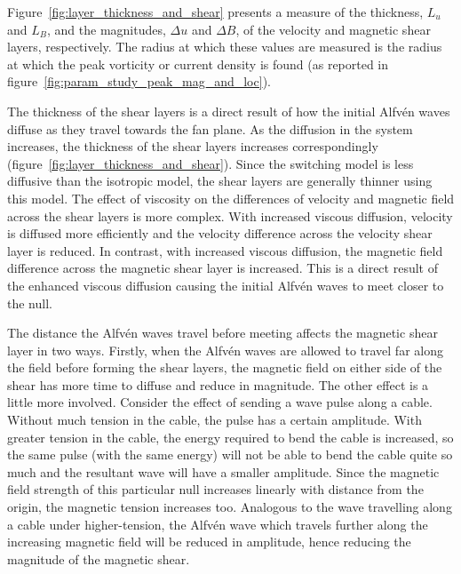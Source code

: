 Figure~\ref{fig:layer_thickness_and_shear} presents a measure of the thickness, $L_u$ and $L_B$, and the magnitudes, $\Delta u$ and $\Delta B$, of the velocity and magnetic shear layers, respectively. The radius at which these values are measured is the radius at which the peak vorticity or current density is found (as reported in figure~\ref{fig:param_study_peak_mag_and_loc}). 

The thickness of the shear layers is a direct result of how the initial Alfv\'en waves diffuse as they travel towards the fan plane. As the diffusion in the system increases, the thickness of the shear layers increases correspondingly (figure~\ref{fig:layer_thickness_and_shear}). Since the switching model is less diffusive than the isotropic model, the shear layers are generally thinner using this model. The effect of viscosity on the differences of velocity and magnetic field across the shear layers is more complex. With increased viscous diffusion, velocity is diffused more efficiently and the velocity difference across the velocity shear layer is reduced. In contrast, with increased viscous diffusion, the magnetic field difference across the magnetic shear layer is increased. This is a direct result of the enhanced viscous diffusion causing the initial Alfv\'en waves to meet closer to the null.

The distance the Alfv\'en waves travel before meeting affects the magnetic shear layer in two ways. Firstly, when the Alfv\'en waves are allowed to travel far along the field before forming the shear layers, the magnetic field on either side of the shear has more time to diffuse and reduce in magnitude. The other effect is a little more involved. Consider the effect of sending a wave pulse along a cable. Without much tension in the cable, the pulse has a certain amplitude. With greater tension in the cable, the energy required to bend the cable is increased, so the same pulse (with the same energy) will not be able to bend the cable quite so much and the resultant wave will have a smaller amplitude. Since the magnetic field strength of this particular null increases linearly with distance from the origin, the magnetic tension increases too. Analogous to the wave travelling along a cable under higher-tension, the Alfv\'en wave which travels further along the increasing magnetic field will be reduced in amplitude, hence reducing the magnitude of the magnetic shear.


